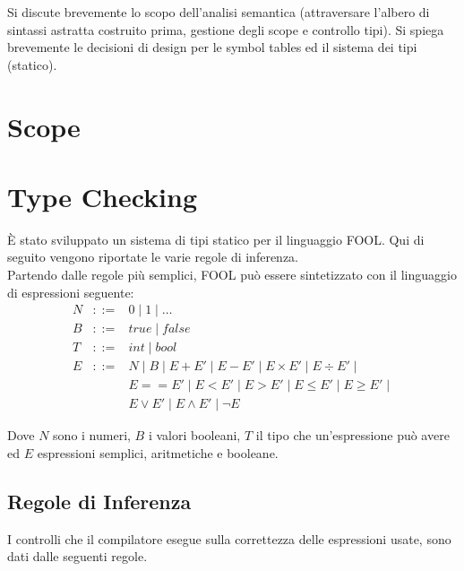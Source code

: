 Si discute brevemente lo scopo dell'analisi semantica (attraversare l'albero di sintassi astratta costruito prima, gestione
degli scope e controllo tipi).
Si spiega brevemente le decisioni di design per le symbol tables ed il sistema dei tipi (statico).
\section{Scope}

\section{Type Checking}
È stato sviluppato un sistema di tipi statico per il linguaggio FOOL. Qui di seguito vengono riportate le varie regole di inferenza.\\

Partendo dalle regole più semplici, FOOL può essere sintetizzato con il linguaggio di espressioni seguente:
\[
\begin{array}{lcl}
N & ::= & 0 \mid 1 \mid \dots\\ 
B & ::= &  true \mid false \\
T & ::= & int \mid bool \\
E & ::= & N \mid B \mid E + E' \mid E - E' \mid E \times E' \mid E \div E' \mid\\
& & E == E' \mid E < E '\mid E > E' \mid E \le E' \mid E \ge E' \mid \\
& & E \lor E' \mid E \land E' \mid \lnot E 
\end{array}
\]

Dove $N$ sono i numeri, $B$ i valori booleani, $T$ il tipo che un'espressione può avere ed $E$ espressioni semplici, aritmetiche e booleane.
\subsection{Regole di Inferenza}

I controlli che il compilatore esegue sulla correttezza delle espressioni usate, sono dati dalle seguenti regole.

